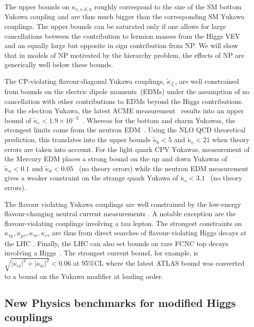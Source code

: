 \documentclass[../report.tex]{subfiles}
\begin{document}
The upper bounds on $\kappa_{c,s,d,u}$ roughly
correspond to the size of the SM bottom Yukawa coupling and are thus much bigger than the corresponding SM Yukawa couplings. The upper bounds can be saturated only if one allows for large cancellations between the
contribution to fermion masses from the Higgs VEV and an equally large
but opposite in sign contribution from NP. We will show that in models
of NP motivated by the hierarchy problem, the effects of NP are
generically well below these bounds.


The CP-violating flavour-diagonal Yukawa couplings, $\tilde \kappa_{f_i}$,
are well constrained from bounds on the electric dipole moments~(EDMs)
\cite{Brod:2013cka,Chien:2015xha,Altmannshofer:2015qra,Brod:2018pli} under the assumption of no 
cancellation with other contributions to EDMs beyond the Higgs contributions.
For the electron Yukawa, the latest ACME measurement~\cite{Baron:2013eja,Andreev:2018ayy} results into an upper bound of $\tilde\kappa_e<1.9\times 10^{-3}$~\cite{Altmannshofer:2015qra}. Whereas for the bottom and charm Yukawas, the strongest limits come from the neutron EDM~\cite{Brod:2018pli}. Using the NLO QCD theoretical prediction, this translates into the upper bounds $\tilde\kappa_b<5$ and $\tilde\kappa_c<21$ when theory errors are taken into account.
For the light quark CPV Yukawas, measurement of the Mercury EDM places a strong bound on the up and down Yukawas of $\tilde\kappa_u<0.1$ and $\tilde\kappa_d<0.05$~\cite{Brod:2018xyz} (no theory errors) while the neutron EDM measurement gives a weaker constraint on the strange quark Yukawa of $\tilde\kappa_s<3.1$~\cite{Brod:2018xyz} (no theory errors).


The flavour violating Yukawa couplings are well constrained by the low-energy
flavour-changing neutral current measurements
\cite{Harnik:2012pb,Blankenburg:2012ex,Gorbahn:2014sha}. A notable
exception are the flavour-violating couplings involving a tau lepton. The
strongest constraints on $\kappa_{\tau\mu}, \kappa_{\mu\tau},
\kappa_{\tau e}, \kappa_{e \tau}$ are thus from direct searches of flavour-violating Higgs decays at
the LHC \cite{Sirunyan:2017xzt,Aad:2016blu}.
Finally, the LHC can also set bounds on rare FCNC top decays involving a Higgs~\cite{Aaboud:2017mfd,Khachatryan:2016atv,Aad:2015pja,Aad:2014dya}. The strongest current bound, for example, is $\sqrt{|\kappa_{ct}|^2+|\kappa_{tc}|^2}<0.06$ at 95\%CL where the latest ATLAS bound was converted to a bound on the Yukawa modifier at leading order.


\subsection{New Physics benchmarks for modified Higgs couplings}
\end{document}
